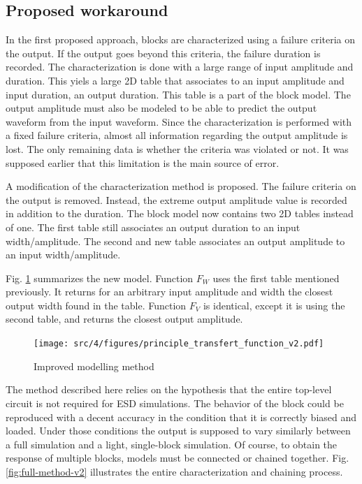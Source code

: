 \subsection{Proposed workaround}

%
In the first proposed approach, blocks are characterized using a failure criteria on the output.
If the output goes beyond this criteria, the failure duration is recorded.
The characterization is done with a large range of input amplitude and duration.
This yiels a large 2D table that associates to an input amplitude and input duration, an output duration.
This table is a part of the block model.
The output amplitude must also be modeled to be able to predict the output waveform from the input waveform.
Since the characterization is performed with a fixed failure criteria, almost all information regarding the output amplitude is lost.
The only remaining data is whether the criteria was violated or not.
It was supposed earlier that this limitation is the main source of error.

A modification of the characterization method is proposed.
The failure criteria on the output is removed.
Instead, the extreme output amplitude value is recorded in addition to the duration.
The block model now contains two 2D tables instead of one.
The first table still associates an output duration to an input width/amplitude.
The second and new table associates an output amplitude to an input width/amplitude.

Fig. \ref{fig:principle-transfert-func-v2} summarizes the new model.
Function $F_{W}$ uses the first table mentioned previously.
It returns for an arbitrary input amplitude and width the closest output width found in the table.
Function $F_{V}$ is identical, except it is using the second table, and returns the closest output amplitude.

\begin{figure}[!h]
  \centering
  \texttt{[image: src/4/figures/principle\_transfert\_function\_v2.pdf]}
  \caption{Improved modelling method}
  \label{fig:principle-transfert-func-v2}
\end{figure}

The method described here relies on the hypothesis that the entire top-level circuit is not required for ESD simulations.
The behavior of the block could be reproduced with a decent accuracy in the condition that it is correctly biased and loaded.
Under those conditions the output is supposed to vary similarly between a full simulation and a light, single-block simulation.
Of course, to obtain the response of multiple blocks, models must be connected or chained together.
Fig. \ref{fig:full-method-v2} illustrates the entire characterization and chaining process.

